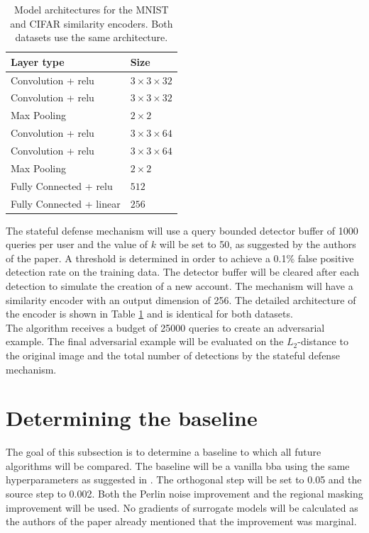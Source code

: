 \begin{table}
	\centering
	\caption[Model architectures for the MNIST and CIFAR similarity encoders]{Model architectures for the MNIST and CIFAR similarity encoders. Both datasets use the same architecture.}
	\begin{tabular}{ll}\toprule
        Layer type     & Size\\ \midrule
        Convolution + \gls{relu}	&$3\times3\times32$\\
        Convolution + \gls{relu}	&$3\times3\times32$\\
        Max Pooling					&$2\times2$\\
        Convolution + \gls{relu}	&$3\times3\times64$\\
        Convolution + \gls{relu}	&$3\times3\times64$\\
        Max Pooling					&$2\times2$\\
        Fully Connected + \gls{relu}&$512$\\
        Fully Connected + linear	&$256$ \\ \bottomrule
    \end{tabular}
    \label{tbl:architectures_encoders}
\end{table}

The stateful defense mechanism \cite{chen_stateful_2019} will use a query bounded detector buffer of 1000 queries per user and the value of $k$ will be set to 50, as suggested by the authors of the paper. A threshold is determined in order to achieve a 0.1\% false positive detection rate on the training data. The detector buffer will be cleared after each detection to simulate the creation of a new account. The mechanism will have a similarity encoder with an output dimension of 256. The detailed architecture of the encoder is shown in Table \ref{tbl:architectures_encoders} and is identical for both datasets.\\

The algorithm receives a budget of \num{25000} queries to create an adversarial example. The final adversarial example will be evaluated on the $L_2$-distance to the original image and the total number of detections by the stateful defense mechanism.

\section{Determining the baseline}\label{sec:baseline}
The goal of this subsection is to determine a baseline to which all future algorithms will be compared. The baseline will be a vanilla \gls{bba} using the same hyperparameters as suggested in \cite{brunner_guessing_2019}. The orthogonal step will be set to 0.05 and the source step to 0.002. Both the Perlin noise improvement and the regional masking improvement will be used. No gradients of surrogate models will be calculated as the authors of the paper already mentioned that the improvement was marginal.\\

